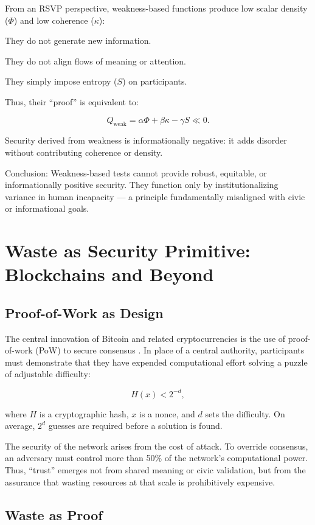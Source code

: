 \documentclass{book}
\begin{document}
From an RSVP perspective, weakness-based functions produce low scalar density (\(\Phi\)) and low coherence (\(\kappa\)):

They do not generate new information.

They do not align flows of meaning or attention.

They simply impose entropy (\( S \)) on participants.

Thus, their “proof” is equivalent to:

\[ Q_{\text{weak}} = \alpha \Phi + \beta \kappa - \gamma S \ll 0. \]

Security derived from weakness is informationally negative: it adds disorder without contributing coherence or density.

Conclusion: Weakness-based tests cannot provide robust, equitable, or informationally positive security. They function only by institutionalizing variance in human incapacity — a principle fundamentally misaligned with civic or informational goals.

\chapter{Waste as Security Primitive: Blockchains and Beyond}

\section{Proof-of-Work as Design}

The central innovation of Bitcoin and related cryptocurrencies is the use of proof-of-work (PoW) to secure consensus \cite{nakamoto2008}. In place of a central authority, participants must demonstrate that they have expended computational effort solving a puzzle of adjustable difficulty:

\[ H(x) < 2^{-d}, \]

where \( H \) is a cryptographic hash, \( x \) is a nonce, and \( d \) sets the difficulty. On average, \( 2^d \) guesses are required before a solution is found.

The security of the network arises from the cost of attack. To override consensus, an adversary must control more than 50\% of the network’s computational power. Thus, “trust” emerges not from shared meaning or civic validation, but from the assurance that wasting resources at that scale is prohibitively expensive.

\section{Waste as Proof}
\end{document}
